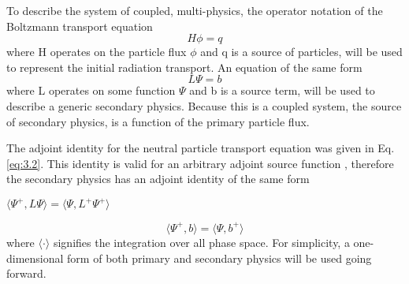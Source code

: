 To describe the system of coupled, multi-physics,
the operator notation of the Boltzmann transport equation
\begin{equation}
	H\phi = q
\end{equation}
where H operates on the particle flux $\phi$ and q is a source of particles, 
will be used to represent the initial radiation transport.
An equation of the same form 
\begin{equation}
	L\Psi = b
\end{equation}
where L operates
on some function $\Psi$ and b is a source term, will be used
to describe a generic secondary physics.
Because this is a coupled system, the source of secondary physics, is a function
of the primary particle flux.

The adjoint identity for the neutral particle transport
equation was given in Eq. \ref{eq:3.2}.
This identity is valid for an arbitrary
adjoint source function
\cite{l_m}, therefore the secondary physics has an adjoint identity of the same
form
\begin{center}
{$\langle \Psi^{+}, L\Psi \rangle = \langle \Psi, L^{+}\Psi^{+} \rangle $}
\end{center}
\begin{equation}\label{eq:adj_2_identity}
	\langle \Psi^{+}, b \rangle =
	\langle \Psi, b^{+} \rangle 
\end{equation}
where $\langle \cdot \rangle$ signifies the integration over all phase space.
For simplicity, a one-dimensional form of both primary and secondary physics
will be used going forward.


